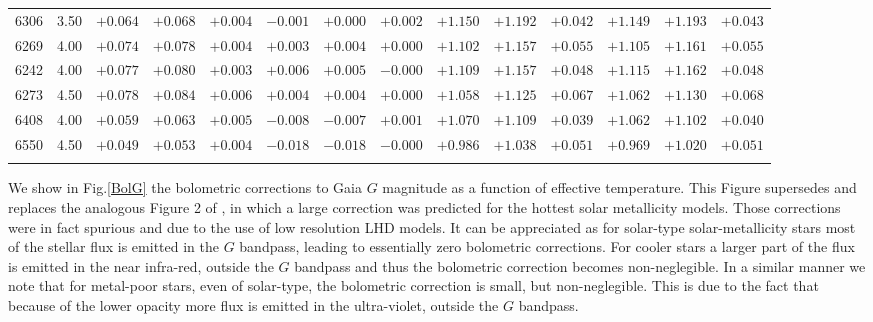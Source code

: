 \documentclass[]{aa}
\begin{document}
\begin{appendix}
\begin{table*}
\begin{center}
\begin{tabular}{llllllllllllll}
6306  &3.50 & $+0.064$ & $+0.068$ & $+0.004$ & $-0.001$ & $+0.000$ & $+0.002$ & $+1.150$ & $+1.192$ & $+0.042$ & $+1.149$ & $+1.193$ & $+0.043$ \\
6269  &4.00 & $+0.074$ & $+0.078$ & $+0.004$ & $+0.003$ & $+0.004$ & $+0.000$ & $+1.102$ & $+1.157$ & $+0.055$ & $+1.105$ & $+1.161$ & $+0.055$ \\
6242  &4.00 & $+0.077$ & $+0.080$ & $+0.003$ & $+0.006$ & $+0.005$ & $-0.000$ & $+1.109$ & $+1.157$ & $+0.048$ & $+1.115$ & $+1.162$ & $+0.048$ \\
6273  &4.50 & $+0.078$ & $+0.084$ & $+0.006$ & $+0.004$ & $+0.004$ & $+0.000$ & $+1.058$ & $+1.125$ & $+0.067$ & $+1.062$ & $+1.130$ & $+0.068$ \\
6408  &4.00 & $+0.059$ & $+0.063$ & $+0.005$ & $-0.008$ & $-0.007$ & $+0.001$ & $+1.070$ & $+1.109$ & $+0.039$ & $+1.062$ & $+1.102$ & $+0.040$ \\
6550  &4.50 & $+0.049$ & $+0.053$ & $+0.004$ & $-0.018$ & $-0.018$ & $-0.000$ & $+0.986$ & $+1.038$ & $+0.051$ & $+0.969$ & $+1.020$ & $+0.051$ \\
\hline\noalign{\smallskip}
\hline\noalign{\smallskip}
\end{tabular}
\end{center}
\end{table*}

We show in Fig.\ref{BolG}
the bolometric corrections to Gaia $G$ magnitude as a function
of effective temperature. 
This Figure supersedes and replaces the analogous Figure 2 of \citet{Bonifacio_Mem}, in which
a large correction was predicted for the hottest solar metallicity models. Those
corrections were in fact spurious and due to the use of  low  resolution LHD models.
It can be appreciated as for solar-type solar-metallicity stars most
of the stellar flux is emitted in the $G$ bandpass, leading to essentially zero
bolometric corrections. For cooler stars a larger part of the flux
is emitted in the near infra-red, outside the $G$ bandpass and thus
the bolometric correction becomes non-neglegible.
In a similar manner we note that for metal-poor stars, even of solar-type,
the bolometric correction is small, but non-neglegible. This is due to the fact
that because of the lower opacity more flux is emitted in the 
ultra-violet, outside the $G$ bandpass.

%
\begin{figure*}[t!]
\caption{\footnotesize
Bolometric corrections in the Gaia G band for four sets of models:
log g = 2.5 (right panel) and log = 4.5 (left panel) at [M/H]=0.0 and [M/H]=--2.0.
Black symbols are computed from our ATLAS models, the lines
are the bolometric corrections computed from the \citet{CK03} grid.
The solid line refers to models of solar metallicity, the dashed
line to models with metallicity --2.0. The red symbols are
the values to which we added the 3D correction.
}
\label{BolG}
\end{figure*}





\end{appendix}
\end{document}
